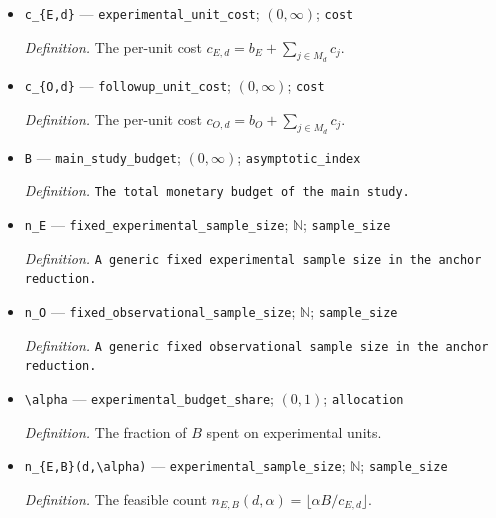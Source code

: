 \documentclass{article}
\begin{document}
\begin{itemize}
  \par\smallskip\noindent\emph{Definition.} The variance component \(V_{O,d}=\mathbb E_P[\phi_{O,d}^2\mid G=O]\).
  \item \texttt{c\_\allowbreak{}\{E,\allowbreak{}d\}\allowbreak{}} --- \texttt{experimental\_\allowbreak{}unit\_\allowbreak{}cost}; \((0,\infty)\); \texttt{cost}
  \par\smallskip\noindent\emph{Definition.} The per-unit cost \(c_{E,d}=b_E+\sum_{j\in M_d}c_j\).
  \item \texttt{c\_\allowbreak{}\{O,\allowbreak{}d\}\allowbreak{}} --- \texttt{followup\_\allowbreak{}unit\_\allowbreak{}cost}; \((0,\infty)\); \texttt{cost}
  \par\smallskip\noindent\emph{Definition.} The per-unit cost \(c_{O,d}=b_O+\sum_{j\in M_d}c_j\).
  \item \texttt{B} --- \texttt{main\_\allowbreak{}study\_\allowbreak{}budget}; \((0,\infty)\); \texttt{asymptotic\_\allowbreak{}index}
  \par\smallskip\noindent\emph{Definition.} \texttt{The total monetary budget of the main study.}
  \item \texttt{n\_\allowbreak{}E} --- \texttt{fixed\_\allowbreak{}experimental\_\allowbreak{}sample\_\allowbreak{}size}; \(\mathbb N\); \texttt{sample\_\allowbreak{}size}
  \par\smallskip\noindent\emph{Definition.} \texttt{A generic fixed experimental sample size in the anchor reduction.}
  \item \texttt{n\_\allowbreak{}O} --- \texttt{fixed\_\allowbreak{}observational\_\allowbreak{}sample\_\allowbreak{}size}; \(\mathbb N\); \texttt{sample\_\allowbreak{}size}
  \par\smallskip\noindent\emph{Definition.} \texttt{A generic fixed observational sample size in the anchor reduction.}
  \item \texttt{\textbackslash{}\allowbreak{}alpha} --- \texttt{experimental\_\allowbreak{}budget\_\allowbreak{}share}; \((0,1)\); \texttt{allocation}
  \par\smallskip\noindent\emph{Definition.} The fraction of \(B\) spent on experimental units.
  \item \texttt{n\_\allowbreak{}\{E,\allowbreak{}B\}\allowbreak{}(d,\allowbreak{}\textbackslash{}\allowbreak{}alpha)} --- \texttt{experimental\_\allowbreak{}sample\_\allowbreak{}size}; \(\mathbb N\); \texttt{sample\_\allowbreak{}size}
  \par\smallskip\noindent\emph{Definition.} The feasible count \(n_{E,B}(d,\alpha)=\lfloor\alpha B/c_{E,d}\rfloor\).

\end{itemize}
\end{document}
